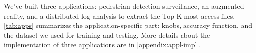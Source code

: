 




We've built three applications: pedestrian detection surveillance, an augmented
reality, and a distributed log analysis to extract the Top-K most access
files. \autoref{tab:apps} summarizes the application-specific part: knobs,
accuracy function, and the dataset we used for training and testing. More
details about the implementation of three applications are in
\autoref{appendix:appl-impl}.

